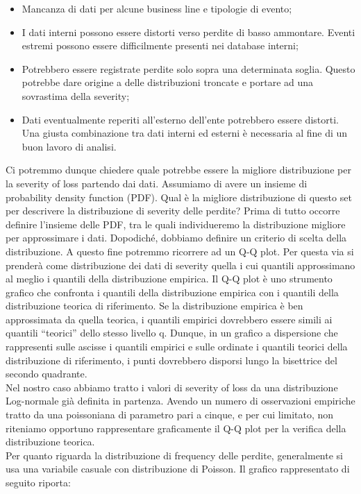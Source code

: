 \documentclass[titlepage]{article}
\begin{document}
\begin{itemize}
\begin{itemize}
\item Mancanza di dati per alcune business line e tipologie di evento;
\item 	I dati interni possono essere distorti verso perdite di basso ammontare. Eventi estremi possono essere difficilmente presenti nei database interni;
\item 	Potrebbero essere registrate perdite solo sopra una determinata soglia. Questo potrebbe dare origine a delle distribuzioni troncate e portare ad una sovrastima della severity;
\item 	Dati eventualmente reperiti all’esterno dell’ente potrebbero essere distorti. Una giusta combinazione tra dati interni ed esterni è necessaria al fine di un buon lavoro di analisi. 
 \end{itemize}
Ci potremmo dunque chiedere quale potrebbe essere la migliore distribuzione per la severity of loss partendo dai dati. Assumiamo di avere un insieme di probability density function (PDF). Qual è la migliore distribuzione di questo set per descrivere la distribuzione di severity delle perdite? Prima di tutto occorre definire l’insieme delle PDF, tra le quali individueremo la distribuzione migliore per approssimare i dati. Dopodiché, dobbiamo definire un criterio di scelta della distribuzione. A questo fine potremmo ricorrere ad un Q-Q plot. Per questa via si prenderà come distribuzione dei dati di severity quella i cui quantili approssimano al meglio i quantili della distribuzione empirica.  Il Q-Q plot è uno strumento grafico che confronta i quantili della distribuzione empirica con i quantili della distribuzione teorica di riferimento. Se la distribuzione empirica è ben approssimata da quella teorica, i quantili empirici dovrebbero essere simili ai quantili “teorici” dello stesso livello q. Dunque, in un grafico a dispersione che rappresenti sulle ascisse i quantili empirici e sulle ordinate i quantili teorici della distribuzione di riferimento, i punti dovrebbero disporsi lungo la bisettrice del secondo quadrante. 
\\
Nel nostro caso abbiamo tratto i valori di severity of loss da una distribuzione Log-normale già definita in partenza. Avendo un numero di osservazioni empiriche tratto da una poissoniana di parametro pari a cinque, e per cui limitato, non riteniamo opportuno rappresentare graficamente il Q-Q plot per la verifica della distribuzione teorica.\\
Per quanto riguarda la distribuzione di frequency delle perdite, generalmente si usa una variabile casuale con distribuzione di Poisson. Il grafico rappresentato di seguito riporta:

\end{itemize}
\end{document}
